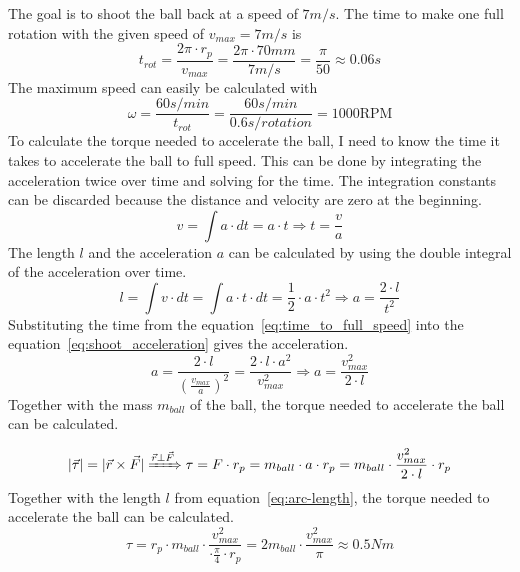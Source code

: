 The goal is to shoot the ball back at a speed of $7m/s$.
The time to make one full rotation with the given speed of $v_{max}=7m/s$ is
\begin{equation}
    \label{eq:time-rot}
    t_{rot} = \frac{2\pi\cdot r_p}{v_{max}} = \frac{2\pi\cdot 70mm}{7m/s} = \frac{\pi}{50} \approx 0.06s
\end{equation}
The maximum speed can easily be calculated with
\begin{equation}
    \label{eq:max_speed}
    \omega = \frac{60s/min}{t_{rot}} = \frac{60s/min}{0.6s/rotation} = 1000\text{RPM}
\end{equation}
To calculate the torque needed to accelerate the ball, I need to know the time it takes to accelerate the ball to full speed.
This can be done by integrating the acceleration twice over time and solving for the time.
The integration constants can be discarded because the distance and velocity are zero at the beginning.
\begin{equation}
    \label{eq:time_to_full_speed}
    v = \int a \cdot dt = a \cdot t \Rightarrow t=\frac{v}{a}
\end{equation}
The length $l$ and the acceleration $a$ can be calculated by using the double integral of the acceleration over time.
\begin{equation}
    \label{eq:shoot_acceleration}
    l = \int v \cdot dt = \int a \cdot t \cdot dt = \frac{1}{2} \cdot a \cdot t^2 \Rightarrow a = \frac{2 \cdot l}{t^2}
\end{equation}
Substituting the time from the equation~\ref{eq:time_to_full_speed} into the equation~\ref{eq:shoot_acceleration} gives the acceleration.
\begin{equation}
    \label{eq:shoot_acceleration_substituted}
    a = \frac{2 \cdot l}{(\frac{v_{max}}{a})^2} = \frac{2 \cdot l \cdot a^2}{v_{max}^2} \Rightarrow a = \frac{v_{max}^2}{2 \cdot l}
\end{equation}
Together with the mass $m_{ball}$ of the ball, the torque needed to accelerate the ball can be calculated.

\begin{equation}
    \label{eq:torque_shoot}
    |\vec{\tau}| = |\vec{r} \times \vec{F}| \xRightarrow{\vec{r} \perp \vec{F}} \tau = F \cdot r_p = m_{ball} \cdot a \cdot r_p = m_{ball} \cdot \frac{v_{max}^2}{2 \cdot l} \cdot r_p
\end{equation}
Together with the length $l$ from equation~\ref{eq:arc-length}, the torque needed to accelerate the ball can be calculated.
\begin{equation}
    \label{eq:torque_shoot_substituted}
    \tau = r_p \cdot m_{ball} \cdot \frac{v_{max}^2}{\cdot\frac{\pi}{4}\cdot r_p} = 2m_{ball} \cdot \frac{v_{max}^2}{\pi} \approx 0.5Nm
\end{equation}



